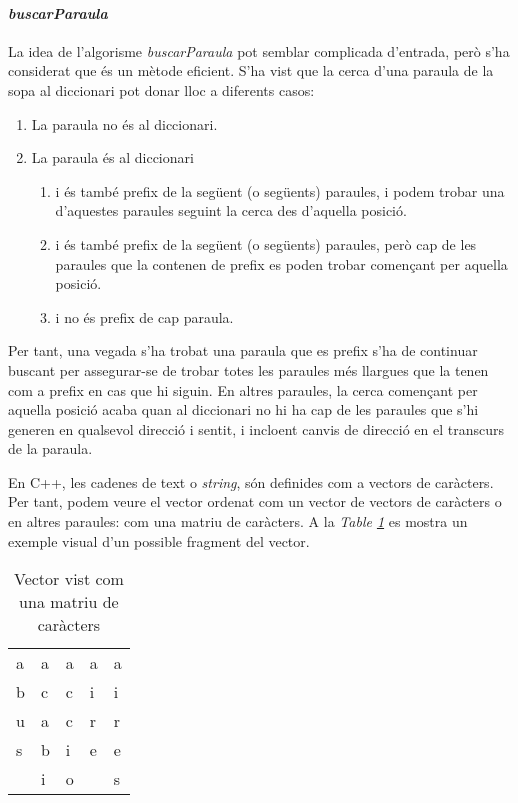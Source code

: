 \documentclass[titlepage]{article}
\begin{document}
\paragraph{\textit{buscarParaula}}
La idea de l'algorisme \textit{buscarParaula} pot semblar complicada d'entrada, però s'ha considerat que és un mètode eficient. S'ha vist que la cerca d'una paraula de la sopa al diccionari pot donar lloc a diferents casos:
\begin{enumerate}
  \item La paraula no és al diccionari.
  \item La paraula és al diccionari
    \begin{enumerate}
    \item i és també prefix de la següent (o següents) paraules, i podem trobar una d'aquestes paraules seguint la cerca des d'aquella posició.
    \item i és també prefix de la següent (o següents) paraules, però cap de les paraules que la contenen de prefix es poden trobar començant per aquella posició.
    \item i no és prefix de cap paraula.
    \end{enumerate}
\end{enumerate}
Per tant, una vegada s'ha trobat una paraula que es prefix s'ha de continuar buscant per assegurar-se de trobar totes les paraules més llargues que la tenen com a prefix en cas que hi siguin. En altres paraules, la cerca començant per aquella posició acaba quan al diccionari no hi ha cap de les paraules que s'hi generen en qualsevol direcció i sentit, i incloent canvis de direcció en el transcurs de la paraula.\newline\par

En C++, les cadenes de text o \textit{string}, són definides com a vectors de caràcters. Per tant, podem veure el vector ordenat com un vector de vectors de caràcters o en altres paraules: com una matriu de caràcters. A la \textit{Table \ref{fig:sortedVector1}} es mostra un exemple visual d'un possible fragment del vector. \newline
\begin{table}[H]
\begin{center}
\begin{tabular}{l|l|l|l|l|}
\hline
\multicolumn{1}{|l|}{a} & a & a & a & a \\
\multicolumn{1}{|l|}{b} & c & c & i & i \\
\multicolumn{1}{|l|}{u} & a & c & r & r \\
\multicolumn{1}{|l|}{s} & b & i & e & e \\ \cline{1-1} \cline{4-4}
                        & i & o &   & s \\ \cline{2-3} \cline{5-5} 
\end{tabular}
\caption{Vector vist com una matriu de caràcters}
            \label{fig:sortedVector1}
\end{center}
\end{table}
\end{document}
